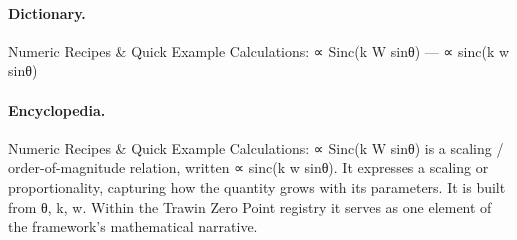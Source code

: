 \paragraph{Dictionary.}
Numeric Recipes \& Quick Example Calculations: ∝ Sinc(k W sinθ) — ∝ sinc(k w sinθ)

\paragraph{Encyclopedia.}
Numeric Recipes \& Quick Example Calculations: ∝ Sinc(k W sinθ) is a scaling / order-of-magnitude relation, written ∝ sinc(k w sinθ). It expresses a scaling or proportionality, capturing how the quantity grows with its parameters. It is built from θ, k, w. Within the Trawin Zero Point registry it serves as one element of the framework's mathematical narrative.

